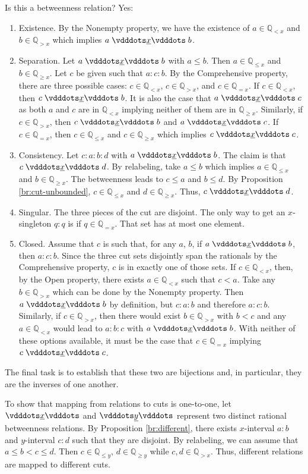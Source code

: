 \documentclass[12pt]{article}
\newcommand{\qcut}[2][x]{\ensuremath{\mathbb{Q}_{#2 #1}}}
\newcommand{\qlt}[1][x]{\qcut[#1]{<}}
\newcommand{\qeq}[1][x]{\qcut[#1]{=}}
\newcommand{\qgt}[1][x]{\qcut[#1]{>}}
\newcommand{\qgeq}[1][x]{\qcut[#1]{\geq}}
\newcommand{\qleq}[1][x]{\qcut[#1]{\leq}}
\newcommand{\yrel}{\xrel[y]}
\begin{document}
Is this a betweenness relation? Yes: 
\begin{enumerate}
    \item Existence. By the Nonempty property, we have the existence of $a \in \qlt$ and $b \in \qgt$ which implies $a \xrel b$. 
    \item Separation. Let $a \xrel b$ with $a \leq b$.  Then $a \in \qleq$ and $b \in \qgeq$. Let $c$ be given such that $a:c:b$. By the Comprehensive property, there are three possible cases: $c \in \qlt$, $c \in \qgt$, and $c \in \qeq$. If $c \in \qlt$, then  $c \xrel b$. It is also the case that \sout{$a \xrel c$} as both $a$ and $c$ are in $\qlt$ implying neither of them are in $\qgeq$. Similarly, if $c \in \qgt$, then \sout{$c \xrel b$} and $a \xrel c$. If $c \in \qeq$, then $c \in \qleq$ and $c \in \qgeq$ which implies $c \xrel c$. 
    \item Consistency. Let $c:a:b:d$ with $ a \xrel b$. The claim is that $c \xrel d$. By relabeling, take $a \leq b$ which implies $a \in \qleq$ and $b \in \qgeq$.  The betweenness leads to $c \leq a$ and $ b \leq d$. By Proposition \ref{br:cut-unbounded},  $c \in \qleq$ and $ d \in \qgeq$. Thus, $c \xrel d$.
    \item Singular. The three pieces of the cut are disjoint. The only way to get an $x$-singleton $q:q$ is if $q \in \qeq$. That set has at most one element. 
    \item Closed. Assume that $c$ is such that, for any $a$, $b$, if $a \xrel b$, then $a:c:b$. Since the three cut sets disjointly span the rationals by the Comprehensive property, $c$ is in exactly one of those sets. If $c \in \qlt$, then, by the Open property, there exists $a \in \qlt$ such that $c < a$. Take any $b \in \qgt$ which can be done by the Nonempty property. Then $a \xrel b$ by definition, but $c: a:b$ and therefore \sout{$a:c:b$}. Similarly, if $c \in \qgt$, then there would exist $b \in \qgt$ with $b < c$ and any $a \in \qlt$ would lead to $a:b:c$ with $a \xrel b$. With neither of these options available, it must be the case that $c \in \qeq$ implying $c \xrel c$.    
\end{enumerate}

The final task is to establish that these two are bijections and, in particular, they are the inverses of one another. 

To show that mapping from relations to cuts is one-to-one, let $\xrel$ and $\yrel$ represent two distinct rational betweenness relations. By Proposition \ref{br:different}, there exists $x$-interval $a:b$ and $y$-interval $c:d$ such that they are disjoint. By relabeling, we can assume that $a \leq b < c \leq d$. Then $c \in \qleq[y]$, $d \in \qgeq[y]$ while $c, d \in \qgt[x]$. Thus, different relations are mapped to different cuts. 
\end{document}
